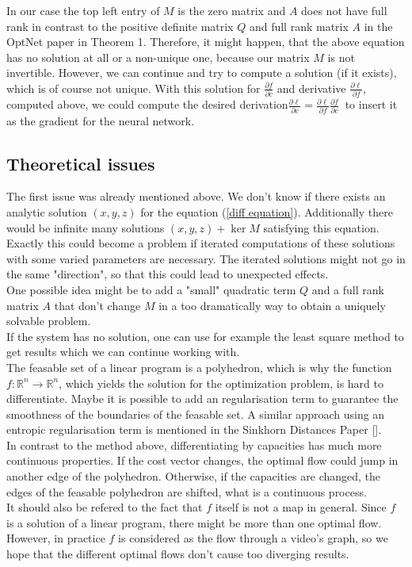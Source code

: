 \documentclass{article}
\begin{document}
In our case the top left entry of $M$ is the zero matrix and $A$ does not have full rank in contrast to the positive definite matrix $Q$ and full rank matrix $A$ in the OptNet paper in Theorem 1. Therefore, it might happen, that the above equation has no solution at all or a non-unique one, because our matrix $M$ is not invertible. However, we can continue and try to compute a solution (if it exists), which is of course not unique. With this solution for $\frac{\partial f}{\partial c}$ and derivative $\frac{\partial \ell}{\partial f}$, computed above, we could compute the desired derivation$\frac{\partial \ell }{\partial c} = \frac{\partial \ell}{\partial f} \frac{\partial f}{\partial c}~
$ to insert it as the gradient for the neural network. 

\subsection{Theoretical issues}

The first issue was already mentioned above. We don't know if there exists an analytic solution $(x,y,z)$ for the equation (\ref*{diff equation}). Additionally there would be infinite many solutions $(x,y,z)+ \ker M$ satisfying this equation. Exactly this could become a problem if iterated computations of these solutions with some varied parameters are necessary. The iterated solutions might not go in the same "direction", so that this could lead to unexpected effects. \\
One possible idea might be to add a "small" quadratic term $Q$ and a full rank matrix $A$ that don't change $M$ in a too dramatically way to obtain a uniquely solvable problem.\\
If the system has no solution, one can use for example the least square method to get results which we can continue working with.\\
The feasable set of a linear program is a polyhedron, which is why the function $f:\mathbb R^n \rightarrow \mathbb R^n$, which yields the solution for the optimization problem, is hard to differentiate. Maybe it is possible to add an regularisation term to guarantee the smoothness of the boundaries of the feasable set. A similar approach using an entropic regularisation term is mentioned in the Sinkhorn Distances Paper []. \\
In contrast to the method above, differentiating by capacities has much more continuous properties. If the cost vector changes, the optimal flow could jump in another edge of the polyhedron. Otherwise, if the capacities are changed, the edges of the feasable polyhedron are shifted, what is a continuous process.\\
It should also be refered to the fact that $f$ itself is not a map in general. Since $f$ is a solution of a linear program, there might be more than one optimal flow. However, in practice $f$ is considered as the flow through a video's graph, so we hope that the different optimal flows don't cause too diverging results. 
\end{document}
